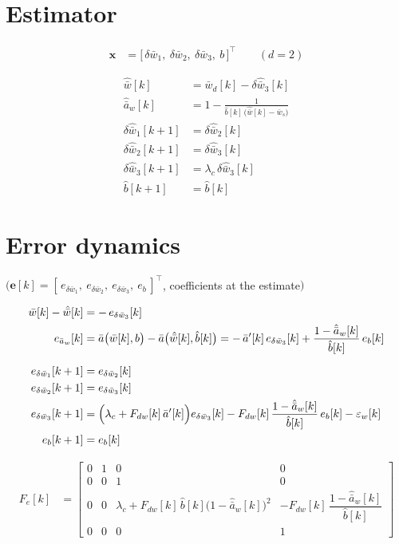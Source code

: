\documentclass[11pt,a4paper,fontset=none]{ctexart}
\newcommand{\ba}{\bar{a}}
\newcommand{\bw}{\bar{w}}
\newcommand{\ap}{\ba'}
\newcommand{\ah}{\hat{\ba}_w}
\newcommand{\bh}{\hat{b}}
\newcommand{\wh}{\hat{\bw}}
\begin{document}
\section{Estimator}

\begin{align*}
\mathbf{x} &= \bigl[\,\delta\bw_1,\ \delta\bw_2,\ \delta\bw_3,\ b\,\bigr]^{\top} \qquad (d = 2)
\end{align*}

\begin{align*}
\wh[k]                 &= \bw_d[k] - \delta\hat{\bw}_3[k] \\
\ah[k]                 &= 1 - \frac{1}{\bh[k]\,\bigl(\wh[k] - \bw_s\bigr)} \\
\delta\hat{\bw}_1[k+1] &= \delta\hat{\bw}_2[k] \\
\delta\hat{\bw}_2[k+1] &= \delta\hat{\bw}_3[k] \\
\delta\hat{\bw}_3[k+1] &= \lambda_c\,\delta\hat{\bw}_3[k] \\
\bh[k+1]               &= \bh[k]
\end{align*}

\section{Error dynamics}

$\bigl(\mathbf{e}[k] = [\,e_{\delta\bw_1},\ e_{\delta\bw_2},\ e_{\delta\bw_3},\ e_b\,]^{\top}$, coefficients at the estimate$\bigr)$

\begin{align*}
\bw[k] - \wh[k]  &= -\,e_{\delta\bw_3}[k] \\
e_{\ba_w}[k]     &= \ba\bigl(\bw[k], b\bigr) - \ba\bigl(\wh[k], \bh[k]\bigr)
                    = -\,\ap[k]\,e_{\delta\bw_3}[k] + \frac{1-\ah[k]}{\bh[k]}\,e_b[k] \\[6pt]
e_{\delta\bw_1}[k+1] &= e_{\delta\bw_2}[k] \\
e_{\delta\bw_2}[k+1] &= e_{\delta\bw_3}[k] \\
e_{\delta\bw_3}[k+1] &= \Bigl(\lambda_c + F_{dw}[k]\,\ap[k]\Bigr)e_{\delta\bw_3}[k]
                        - F_{dw}[k]\,\frac{1-\ah[k]}{\bh[k]}\,e_b[k] - \varepsilon_w[k] \\
e_b[k+1]             &= e_b[k]
\end{align*}

\begin{align*}
F_e[k] &= \begin{bmatrix}
0 & 1 & 0 & 0 \\
0 & 0 & 1 & 0 \\
0 & 0 & \lambda_c + F_{dw}[k]\,\bh[k]\bigl(1-\ah[k]\bigr)^{2}
      & -F_{dw}[k]\,\dfrac{1-\ah[k]}{\bh[k]} \\
0 & 0 & 0 & 1
\end{bmatrix}
\end{align*}
\end{document}
